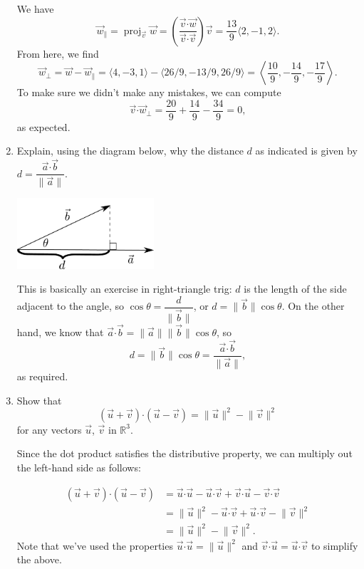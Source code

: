 \documentclass[12pt]{article}
\newcommand{\len}[1]{\lVert #1\rVert}
\newcommand{\R}{\mathbb{R}}
\newcommand{\dotp}{\boldsymbol{\cdot}}
\begin{document}
\begin{enumerate}
    We have
    \[
    \vec{w}_\parallel=\operatorname{proj}_{\vec{v}}\vec{w} = \left(\frac{\vec{v}\dotp\vec{w}}{\vec{v}\dotp\vec{v}}\right)\vec{v} = \frac{13}{9}\langle 2,-1,2\rangle.
    \]
    From here, we find
    \[
    \vec{w}_\bot=\vec{w}-\vec{w}_\parallel = \langle 4,-3,1\rangle - \langle 26/9,-13/9,26/9\rangle = \left\langle \frac{10}{9}, -\frac{14}{9},-\frac{17}{9}\right\rangle.
    \]
    To make sure we didn't make any mistakes, we can compute
    \[
    \vec{v}\dotp\vec{w}_\bot = \frac{20}{9}+\frac{14}{9}-\frac{34}{9}=0,
    \]
    as expected.
    
    \item Explain, using the diagram below, why the distance $d$ as indicated is given by $d = \dfrac{\vec{a}\dotp \vec{b}}{\len{\vec{a}}}$.
    
    \begin{flushleft}
    \includegraphics[width=2in]{T3-proj}
    \end{flushleft}
    
    This is basically an exercise in right-triangle trig: $d$ is the length of the side adjacent to the angle, so $\cos\theta = \dfrac{d}{\len{\vec{b}}}$, or $d=\len{\vec{b}}\cos\theta$. On the other hand, we know that $\vec{a}\dotp\vec{b}=\len{\vec{a}}\len{\vec{b}}\cos\theta$, so 
    \[
    d=\len{\vec{b}}\cos\theta = \frac{\vec{a}\dotp\vec{b}}{\len{\vec{a}}},
    \]
    as required. 
    \item Show that
    \[
    (\vec{u}+\vec{v})\dotp (\vec{u}-\vec{v}) = \len{\vec{u}}^2-\len{\vec{v}}^2
    \]
    for any vectors $\vec{u}$, $\vec{v}$ in $\R^3$.
    
    \bigskip
    
    Since the dot product satisfies the distributive property, we can multiply out the left-hand side as follows:
    
    \begin{align*}
    (\vec{u}+\vec{v})\dotp(\vec{u}-\vec{v}) & = \vec{u}\dotp\vec{u}-\vec{u}\dotp\vec{v}+\vec{v}\dotp\vec{u}- \vec{v}\dotp\vec{v}\\
    & = \len{\vec{u}}^2-\vec{u}\dotp\vec{v}+\vec{u}\dotp\vec{v}-\len{\vec{v}}^2\\
    & = \len{\vec{u}}^2-\len{\vec{v}}^2.
    \end{align*}
    Note that we've used the properties $\vec{u}\dotp\vec{u}=\len{\vec{u}}^2$ and $\vec{v}\dotp\vec{u}=\vec{u}\dotp\vec{v}$ to simplify the above.
\end{enumerate}
  
\end{document}
